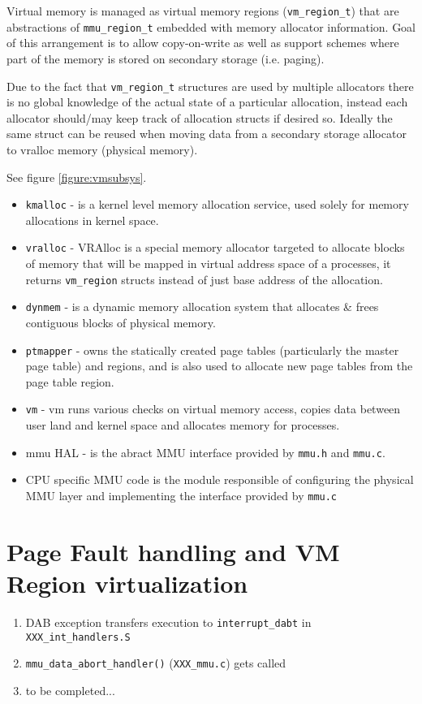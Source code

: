 Virtual memory is managed as virtual memory regions (\verb+vm_region_t+) that
are abstractions of \verb+mmu_region_t+ embedded with memory allocator
information. Goal of this arrangement is to allow copy-on-write as well as
support schemes where part of the memory is stored on secondary storage
(i.e. paging).

Due to the fact that \verb+vm_region_t+ structures are used by multiple
allocators there is no global knowledge of the actual state of a particular
allocation, instead each allocator should/may keep track of allocation structs
if desired so. Ideally the same struct can be reused when moving data from a
secondary storage allocator to vralloc memory (physical memory).


See figure \ref{figure:vmsubsys}.

\begin{itemize}
  \item \verb+kmalloc+  - is a kernel level memory allocation service, used
                        solely for memory allocations in kernel space.
  \item \verb+vralloc+  - VRAlloc is a special memory allocator targeted to
                        allocate blocks of memory that will be mapped in virtual
                        address space of a processes, it returns
                        \verb+vm_region+ structs instead of just base address of
                        the allocation.
  \item \verb+dynmem+   - is a dynamic memory allocation system that allocates
                        \& frees contiguous blocks of physical memory.
  \item \verb+ptmapper+ - owns the statically created page tables (particularly
                        the master page table) and regions, and is also used to
                        allocate new page tables from the page table region.
  \item \verb+vm+       - vm runs various checks on virtual memory access,
                        copies data between user land and kernel space and
                        allocates memory for processes.
  \item mmu HAL -       is the abract MMU interface provided by \verb+mmu.h+
                        and \verb+mmu.c+.
  \item CPU specific MMU code is the module responsible of configuring the
        physical MMU layer and implementing the interface provided by
        \verb+mmu.c+
\end{itemize}


\section{Page Fault handling and VM Region virtualization}

\begin{enumerate}
\item DAB exception transfers execution to \verb+interrupt_dabt+ in \verb+XXX_int_handlers.S+
\item \verb+mmu_data_abort_handler()+ (\verb+XXX_mmu.c+) gets called
\item to be completed...
\end{enumerate}